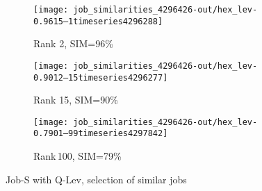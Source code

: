 \documentclass{jhps}
\begin{document}
\begin{figure}[bt]
\begin{subfigure}{0.47\textwidth}
\centering
\texttt{[image: job\_similarities\_4296426-out/hex\_lev-0.9615--1timeseries4296288]}
\caption{Rank 2, SIM=96\%}
\end{subfigure}
\begin{subfigure}{0.47\textwidth}
\centering
\texttt{[image: job\_similarities\_4296426-out/hex\_lev-0.9012--15timeseries4296277]}
\caption{Rank 15, SIM=90\%}
\end{subfigure}
\begin{subfigure}{0.47\textwidth}
\centering
\texttt{[image: job\_similarities\_4296426-out/hex\_lev-0.7901--99timeseries4297842]}
\caption{Rank\,100, SIM=79\%}
\end{subfigure}

\caption{Job-S with Q-Lev, selection of similar jobs}%
\label{fig:job-S-hex-lev}
\end{figure}

%

%
\end{document}
